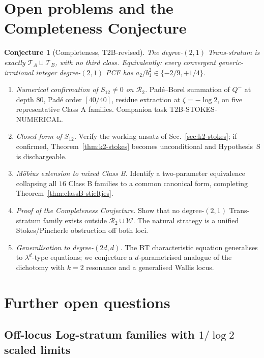 \documentclass[11pt,a4paper]{article}
\newtheorem{conjecture}[theorem]{Conjecture}
\theoremstyle{definition}
\begin{document}
\section{Open problems and the Completeness Conjecture}\label{sec:open}

\begin{conjecture}[Completeness, T2B-revised]\label{conj:completeness}
The degree-$(2,1)$ Trans-stratum is exactly $\mathcal{T}_A \sqcup \mathcal{T}_B$, with no third class. Equivalently: every convergent generic-irrational integer degree-$(2,1)$ PCF has $a_2/b_1^2 \in \{-2/9, +1/4\}$.
\end{conjecture}

\begin{enumerate}
  \item \emph{Numerical confirmation of $S_{12}\ne 0$ on $\mathcal{R}_2$.} Padé--Borel summation of $Q^-$ at depth $80$, Padé order $[40/40]$, residue extraction at $\zeta=-\log 2$, on five representative Class A families. Companion task T2B-STOKES-NUMERICAL.
  \item \emph{Closed form of $S_{12}$.} Verify the working ansatz of Sec.~\ref{sec:k2-stokes}; if confirmed, Theorem~\ref{thm:k2-stokes} becomes unconditional and Hypothesis~S is dischargeable.
  \item \emph{Möbius extension to mixed Class B.} Identify a two-parameter equivalence collapsing all $16$ Class B families to a common canonical form, completing Theorem~\ref{thm:classB-stieltjes}.
  \item \emph{Proof of the Completeness Conjecture.} Show that no degree-$(2,1)$ Trans-stratum family exists outside $\mathcal{R}_2 \cup \mathcal{W}$. The natural strategy is a unified Stokes/Pincherle obstruction off both loci.
  \item \emph{Generalisation to degree-$(2d,d)$.} The BT characteristic equation generalises to $\lambda^d$-type equations; we conjecture a $d$-parametrised analogue of the dichotomy with $k=2$ resonance and a generalised Wallis locus.
\end{enumerate}

\section{Further open questions}\label{sec:further-open}

\subsection*{Off-locus Log-stratum families with $1/\!\log 2$ scaled limits}
\end{document}
